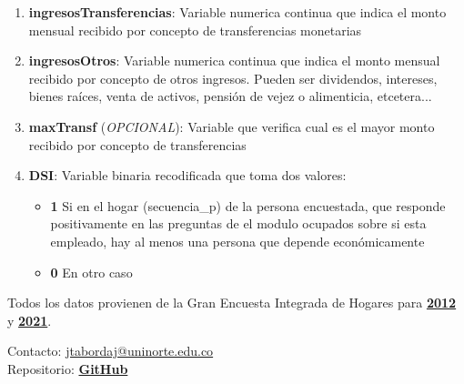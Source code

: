 \documentclass[12pt,a4paper]{article}
\begin{document}
\begin{enumerate}
		\item \textbf{ingresosTransferencias}: Variable numerica continua que indica el monto mensual recibido por concepto de transferencias monetarias
		\item \textbf{ingresosOtros}: Variable numerica continua que indica el monto mensual recibido por concepto de otros ingresos. Pueden ser dividendos, intereses, bienes raíces, venta de activos, pensión de vejez o alimenticia, etcetera...
		\item \textbf{maxTransf} (\textit{OPCIONAL}): Variable que verifica cual es el mayor monto recibido por concepto de transferencias
		\item \textbf{DSI}: Variable binaria recodificada que toma dos valores:
		\begin{itemize}
			\item \textbf{1} Si en el hogar (secuencia\_p) de la persona encuestada, que responde positivamente en las preguntas de el modulo ocupados sobre si esta empleado, hay al menos una persona que depende económicamente
			\item \textbf{0} En otro caso
		\end{itemize}
\end{enumerate}

Todos los datos provienen de la Gran Encuesta Integrada de Hogares para \textbf{\href{https://microdatos.dane.gov.co/index.php/catalog/77/study-description}{2012}} y  \textbf{\href{https://microdatos.dane.gov.co/index.php/catalog/701/study-description}{2021}}.

\vfill

\noindent Contacto: \href{mailto:jtabordaj@uninorte.edu.co}{jtabordaj@uninorte.edu.co} \\
Repositorio: \textbf{\href{https://github.com/jtabordaj/research_perilla}{GitHub}}
\end{document}
